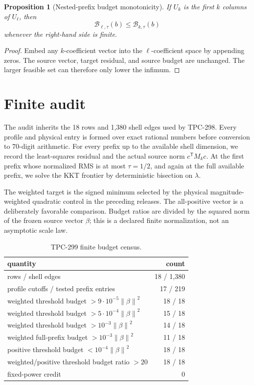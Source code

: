 \documentclass[10pt]{article}
\newtheorem{proposition}{Proposition}
\newcommand{\norm}[1]{\left\lVert #1\right\rVert}
\newcommand{\B}{\mathcal B}
\begin{document}
\begin{proposition}[Nested-prefix budget monotonicity]
If $U_k$ is the first $k$ columns of $U_\ell$, then
\[
 \B_{\ell,\tau}(b)\leq\B_{k,\tau}(b)
 \]
whenever the right-hand side is finite.
\end{proposition}

\begin{proof}
Embed any $k$-coefficient vector into the $\ell$-coefficient space by
appending zeros.  The source vector, target residual, and source budget are
unchanged.  The larger feasible set can therefore only lower the infimum.
\end{proof}

\section{Finite audit}

The audit inherits the 18 rows and 1,380 shell edges used by TPC-298.
Every profile and physical entry is formed over exact rational numbers
before conversion to 70-digit arithmetic.  For every prefix up to the
available shell dimension, we record the least-squares residual and the
actual source norm $c^{\mathsf T}M_kc$.  At the first prefix whose normalized
RMS is at most $\tau=1/2$, and again at the full available prefix, we solve
the KKT frontier by deterministic bisection on $\lambda$.

The weighted target is the signed minimum selected by the physical
magnitude-weighted quadratic control in the preceding releases.  The
all-positive vector is a deliberately favorable comparison.  Budget ratios
are divided by the squared norm of the frozen source vector $\beta$; this is
a declared finite normalization, not an asymptotic scale law.

\begin{table}[ht]
\centering
\small
\caption{TPC-299 finite budget census.}
\label{tab:census}
\begin{tabular}{@{}lr@{}}
\toprule
quantity & count\\
\midrule
rows / shell edges & 18 / 1,380\\
profile cutoffs / tested prefix entries & 17 / 219\\
weighted threshold budget $>9\cdot10^{-5}\norm{\beta}^2$ & 18 / 18\\
weighted threshold budget $>5\cdot10^{-4}\norm{\beta}^2$ & 15 / 18\\
weighted threshold budget $>10^{-3}\norm{\beta}^2$ & 14 / 18\\
weighted full-prefix budget $>10^{-3}\norm{\beta}^2$ & 11 / 18\\
positive threshold budget $<10^{-4}\norm{\beta}^2$ & 18 / 18\\
weighted/positive threshold budget ratio $>20$ & 18 / 18\\
fixed-power credit & 0\\
\bottomrule
\end{tabular}
\end{table}
\end{document}
